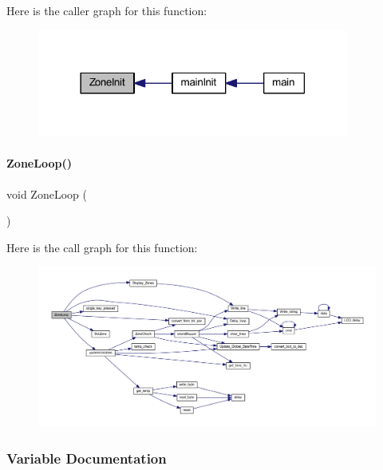Here is the caller graph for this function\+:
\nopagebreak
\begin{figure}[H]
\begin{center}
\leavevmode
\includegraphics[width=290pt]{a00059_aad1cb50e4ddc412138066d4c3b4d9529_icgraph}
\end{center}
\end{figure}
\mbox{\label{a00059_abccb53860a5e66a86e77b648e47cc4c4}} 
\paragraph{Zone\+Loop()}
{\footnotesize\ttfamily void Zone\+Loop (\begin{DoxyParamCaption}{ }\end{DoxyParamCaption})}

Here is the call graph for this function\+:
\nopagebreak
\begin{figure}[H]
\begin{center}
\leavevmode
\includegraphics[width=350pt]{a00059_abccb53860a5e66a86e77b648e47cc4c4_cgraph}
\end{center}
\end{figure}


\subsubsection{Variable Documentation}
\mbox{\label{a00059_a0c777c89cc8b06ddc6c0176f2c31033f}} 
